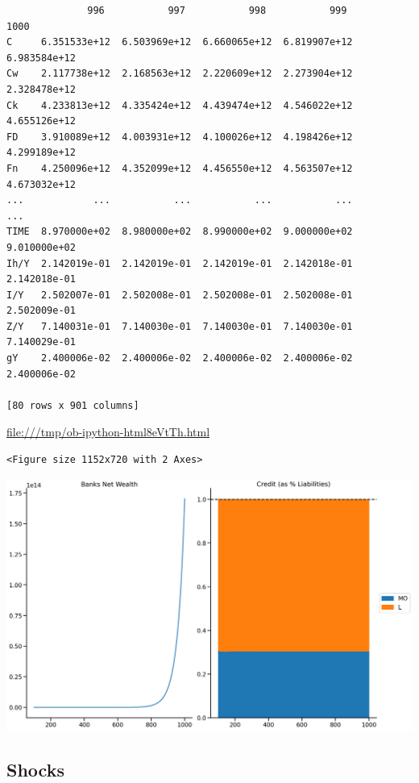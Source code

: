 \documentclass[11pt]{article}
\begin{document}
\begin{verbatim}
              996           997           998           999           1000  
C     6.351533e+12  6.503969e+12  6.660065e+12  6.819907e+12  6.983584e+12  
Cw    2.117738e+12  2.168563e+12  2.220609e+12  2.273904e+12  2.328478e+12  
Ck    4.233813e+12  4.335424e+12  4.439474e+12  4.546022e+12  4.655126e+12  
FD    3.910089e+12  4.003931e+12  4.100026e+12  4.198426e+12  4.299189e+12  
Fn    4.250096e+12  4.352099e+12  4.456550e+12  4.563507e+12  4.673032e+12  
...            ...           ...           ...           ...           ...  
TIME  8.970000e+02  8.980000e+02  8.990000e+02  9.000000e+02  9.010000e+02  
Ih/Y  2.142019e-01  2.142019e-01  2.142019e-01  2.142018e-01  2.142018e-01  
I/Y   2.502007e-01  2.502008e-01  2.502008e-01  2.502008e-01  2.502009e-01  
Z/Y   7.140031e-01  7.140030e-01  7.140030e-01  7.140030e-01  7.140029e-01  
gY    2.400006e-02  2.400006e-02  2.400006e-02  2.400006e-02  2.400006e-02  

[80 rows x 901 columns]
\end{verbatim}


\url{file:///tmp/ob-ipython-html8eVtTh.html}

\begin{verbatim}
<Figure size 1152x720 with 2 Axes>
\end{verbatim}


\begin{center}
\includegraphics[width=.9\linewidth]{obipy-resources/833ba20b4aec1c9746a2e4fcac62a826eabb201d/2c047f9da9769dec6676c8b78dbd7b58ee5d8285.png}
\end{center}

\subsection{Shocks}
\label{sec:orgab755f9}
\end{document}

